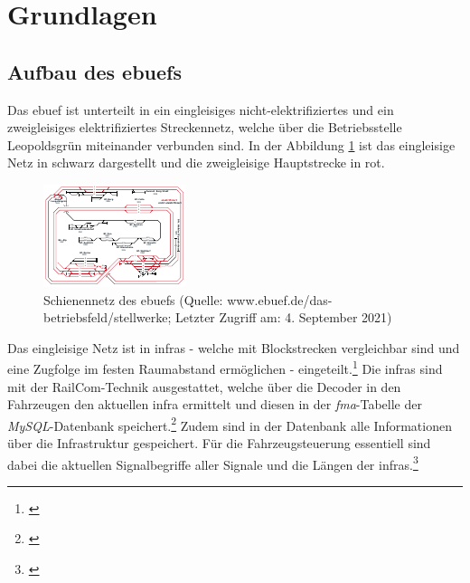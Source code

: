 \section{Grundlagen} \label{grundlagenKapitel}
\acresetall
\subsection{Aufbau des \acl{ebuef}s}
Das \ac{ebuef} ist unterteilt in ein eingleisiges nicht-elektrifiziertes und ein zweigleisiges elektrifiziertes Streckennetz, welche über die Betriebsstelle Leopoldsgrün miteinander verbunden sind. In der Abbildung \ref{fig:ebuefNetz} ist das eingleisige Netz in schwarz dargestellt und die zweigleisige Hauptstrecke in rot.
\begin{figure}
  \includegraphics[width=\linewidth]{../images/netz/plan.pdf}
  \caption[Schienennetz des \ac{ebuef}s]{Schienennetz des \ac{ebuef}s (Quelle: www.ebuef.de/das-betriebsfeld/stellwerke; Letzter Zugriff am: 4. September 2021)}
  \label{fig:ebuefNetz}
\end{figure}
Das eingleisige Netz ist in \acp{infra} - welche mit Blockstrecken vergleichbar sind und eine Zugfolge im festen Raumabstand ermöglichen - eingeteilt.\footnote{\citet[S. 7, 42]{pachl1999systemtechnik}} Die \acp{infra} sind mit der RailCom-Technik ausgestattet, welche über die Decoder in den Fahrzeugen den aktuellen \ac{infra} ermittelt und diesen in der \textit{fma}-Tabelle der \textit{MySQL}-Datenbank speichert.\footnote{\cite{railcomnorm}} Zudem sind in der Datenbank alle Informationen über die Infrastruktur gespeichert. Für die Fahrzeugsteuerung essentiell sind dabei die aktuellen Signalbegriffe aller Signale und die Längen der \acp{infra}.\footnote{\cite{ebuef}}


